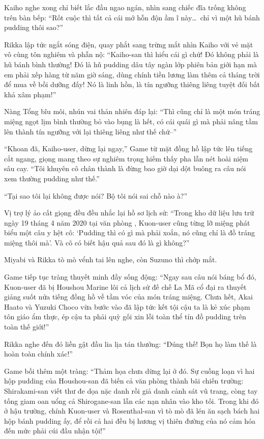 \documentclass[../main.tex]{subfiles}
\begin{document}
Kaiho nghe xong chỉ biết lắc đầu ngao ngán, nhìn sang chiếc đĩa trống không trên bàn bếp: ``Rốt cuộc thì tất cả cái mớ hỗn độn ầm ĩ này\dots\ chỉ vì một hũ bánh pudding thôi sao?''

Rikka lập tức ngắt sóng điện, quay phắt sang trừng mắt nhìn Kaiho với vẻ mặt vô cùng tôn nghiêm và phẫn nộ: ``Kaiho-san thì hiểu cái gì chứ! Đó không phải là hũ bánh bình thường! Đó là hũ pudding dâu tây ngàn lớp phiên bản giới hạn mà em phải xếp hàng từ năm giờ sáng, dùng chính tiền lương làm thêm cả tháng trời để mua về bồi dưỡng đấy! Nó là linh hồn, là tín ngưỡng thiêng liêng tuyệt đối bất khả xâm phạm!''

Nàng Tổng bĩu môi, nhún vai thản nhiên đáp lại: ``Thì cũng chỉ là một món tráng miệng ngọt lịm bình thường bỏ vào bụng là hết, có cái quái gì mà phải nâng tầm lên thành tín ngưỡng với lại thiêng liêng như thế chứ--''

``Khoan đã, Kaiho-user, dừng lại ngay,'' Game từ mặt đồng hồ lập tức lên tiếng cắt ngang, giọng mang theo sự nghiêm trọng hiếm thấy pha lẫn nét hoài niệm sâu cay. ``Tôi khuyên cô chân thành là đừng bao giờ dại dột buông ra câu nói xem thường pudding như thế.''

``Tại sao tôi lại không được nói? Bộ tôi nói sai chỗ nào à?''

Vị trợ lý ảo cất giọng đều đều nhắc lại hồ sơ lịch sử: ``Trong kho dữ liệu lưu trữ ngày 19 tháng 4 năm 2020 tại văn phòng \hll, Kuon-user cũng từng lỡ miệng phát biểu một câu y hệt cô: `Pudding thì có gì mà phải xoắn, nó cũng chỉ là đồ tráng miệng thôi mà'. Và cô có biết hậu quả sau đó là gì không?''

Miyabi và Rikka tò mò vểnh tai lên nghe, còn Suzuno thì chớp mắt.

Game tiếp tục tràng thuyết minh đầy sống động: ``Ngay sau câu nói báng bổ đó, Kuon-user đã bị Houshou Marine lôi cả lịch sử đế chế La Mã cổ đại ra thuyết giảng suốt nửa tiếng đồng hồ về tầm vóc của món tráng miệng. Chưa hết, Akai Haato và Yuzuki Choco vừa bước vào đã lập tức kết tội cậu ta là kẻ xúc phạm tôn giáo ẩm thực, ép cậu ta phải quỳ gối xin lỗi toàn thể tín đồ pudding trên toàn thế giới!''

Rikka nghe đến đó liền gật đầu lia lịa tán thưởng: ``Đúng thế! Bọn họ làm thế là hoàn toàn chính xác!''

Game bồi thêm một tràng: ``Thảm họa chưa dừng lại ở đó. Sự cuồng loạn vì hai hộp pudding của Houshou-san đã biến cả văn phòng thành bãi chiến trường: Shirakami-san viết thư đe dọa nặc danh rồi giả danh cảnh sát vũ trang, còng tay tống giam oan uổng cả Shirogane-san lẫn các nạn nhân vào kho tối. Trong khi đó ở hậu trường, chính Kuon-user và Rosenthal-san vì tò mò đã lén ăn sạch bách hai hộp bánh pudding ấy, để rồi cả hai đều bị hương vị thiên đường của nó cảm hóa đến mức phải cúi đầu nhận tội!''
\end{document}

